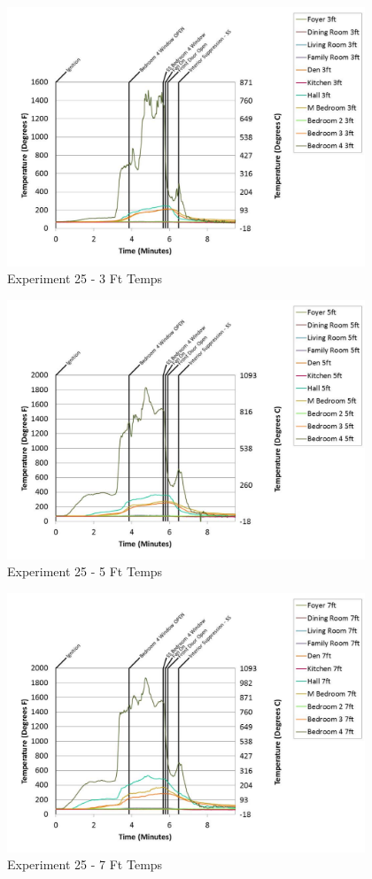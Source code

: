\documentclass{article}
\begin{document}
\begin{appendices}
	\begin{figure}[h!]
		\centering
		\includegraphics[height=3.05in]{0_Images/Results_Charts/Exp_25_Charts/3FtTemps.pdf}
		\caption{Experiment 25 - 3 Ft Temps}
	\end{figure}
 
	\clearpage

	\begin{figure}[h!]
		\centering
		\includegraphics[height=3.05in]{0_Images/Results_Charts/Exp_25_Charts/5FtTemps.pdf}
		\caption{Experiment 25 - 5 Ft Temps}
	\end{figure}
 

	\begin{figure}[h!]
		\centering
		\includegraphics[height=3.05in]{0_Images/Results_Charts/Exp_25_Charts/7FtTemps.pdf}
		\caption{Experiment 25 - 7 Ft Temps}
	\end{figure}
 

\end{appendices}
\end{document}
